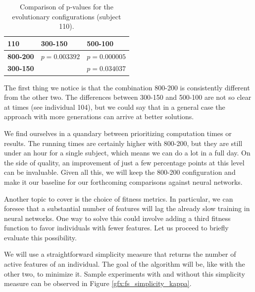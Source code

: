     \begin{table}[h]

        \centering
        \setlength\arrayrulewidth{0.8pt}

        \begin{tabular}{| >{\centering\arraybackslash}m{0.9in} |  >{\centering\arraybackslash}m{0.9in} | >{\centering\arraybackslash}m{0.9in} |}

            \hline
            \rowcolor{RoyalBlue}
            \textbf{110} & \textbf{300-150} & \textbf{500-100} \\
            \hline
            \cellcolor{RoyalBlue}\textbf{800-200} & $p = 0.003392$ & $p = 0.000005$ \\
            \hline
            \cellcolor{RoyalBlue}\textbf{300-150} & \cellcolor{lightgray} & $p = 0.034037$ \\
            \hline

        \end{tabular}

        \caption{Comparison of p-values for the evolutionary configurations (subject 110).}\label{table:popgen_kruskal_110}

    \end{table}

    The first thing we notice is that the combination 800-200 is consistently different from the other two. The differences between 300-150 and 500-100 are not so clear at times (see individual 104), but we could say that in a general case the approach with more generations can arrive at better solutions.

    We find ourselves in a quandary between prioritizing computation times or results. The running times are certainly higher with 800-200, but they are still under an hour for a single subject, which means we can do a lot in a full day. On the side of quality, an improvement of just a few percentage points at this level can be invaluable. Given all this, we will keep the 800-200 configuration and make it our baseline for our forthcoming comparisons against neural networks.

    Another topic to cover is the choice of fitness metrics. In particular, we can foresee that a substantial number of features will lag the already slow training in neural networks. One way to solve this could involve adding a third fitness function to favor individuals with fewer features. Let us proceed to briefly evaluate this possibility.

    We will use a straightforward simplicity measure that returns the number of active features of an individual. The goal of the algorithm will be, like with the other two, to minimize it. Sample experiments with and without this simplicity measure can be observed in Figure \ref{gfx:fs_simplicity_kappa}.

